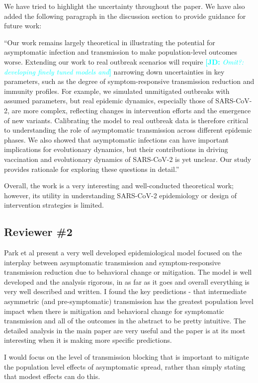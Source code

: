 \documentclass[12pt]{article}
\newcommand{\rev}{\subsection*}
\newcommand{\revtext}{\textsf}
\newcommand{\comment}[3]{\textcolor{#1}{\textbf{[#2: }\textsl{#3}\textbf{]}}}
\newcommand{\jd}[1]{\comment{cyan}{JD}{#1}}
\begin{document}
We have tried to highlight the uncertainty throughout the paper. 
We have also added the following paragraph in the discussion section to provide guidance for future work:

``Our work remains largely theoretical in illustrating the potential for asymptomatic infection and transmission to make population-level outcomes worse.
Extending our work to real outbreak scenarios will require \jd{Omit?: developing finely tuned models and} narrowing down uncertainties in key parameters, such as the degree of symptom-responsive transmission reduction and immunity profiles.
For example, we simulated unmitigated outbreaks with assumed parameters, but real epidemic dynamics, especially those of SARS-CoV-2, are more complex, reflecting changes in intervention efforts and the emergence of new variants.
Calibrating the model to real outbreak data is therefore critical to understanding the role of asymptomatic transmission across different epidemic phases.
We also showed that asymptomatic infections can have important implications for evolutionary dynamics, but their contributions in driving vaccination and evolutionary dynamics of SARS-CoV-2 is yet unclear.
Our study provides rationale for exploring these questions in detail.''

\revtext{Overall, the work is a very interesting and well-conducted theoretical work; however, its utility in understanding SARS-CoV-2 epidemiology or design of intervention strategies is limited.}

\rev{Reviewer \#2}

\revtext{Park et al present a very well developed epidemiological model focused on the interplay between asymptomatic transmission and symptom-responsive transmission reduction due to behavioral change or mitigation. The model is well developed and the analysis rigorous, in as far as it goes and overall everything is very well described and written. I found the key predictions - that intermediate asymmetric (and pre-symptomatic) transmission has the greatest population level impact when there is mitigation and behavioral change for symptomatic transmission and all of the outcomes in the abstract to be pretty intuitive. The detailed analysis in the main paper are very useful and the paper is at its most interesting when it is making more specific predictions.}

\revtext{I would focus on the level of transmission blocking that is important to mitigate the population level effects of asymptomatic spread, rather than simply stating that modest effects can do this.}
\end{document}
